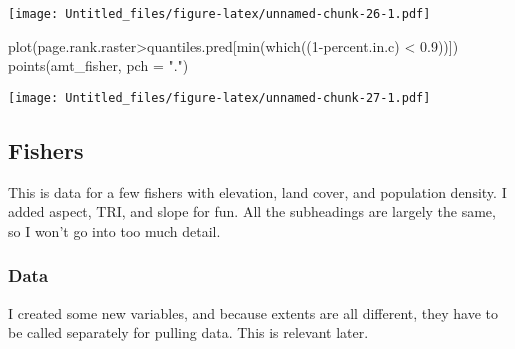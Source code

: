 \documentclass[
]{article}
\newenvironment{Shaded}{\begin{snugshade}}{\end{snugshade}}
\newcommand{\AttributeTok}[1]{\textcolor[rgb]{0.77,0.63,0.00}{#1}}
\newcommand{\DecValTok}[1]{\textcolor[rgb]{0.00,0.00,0.81}{#1}}
\newcommand{\FloatTok}[1]{\textcolor[rgb]{0.00,0.00,0.81}{#1}}
\newcommand{\FunctionTok}[1]{\textcolor[rgb]{0.00,0.00,0.00}{#1}}
\newcommand{\NormalTok}[1]{#1}
\newcommand{\SpecialCharTok}[1]{\textcolor[rgb]{0.00,0.00,0.00}{#1}}
\newcommand{\StringTok}[1]{\textcolor[rgb]{0.31,0.60,0.02}{#1}}
\begin{document}
\texttt{[image: Untitled\_files/figure-latex/unnamed-chunk-26-1.pdf]}

\begin{Shaded}
\begin{Highlighting}[]
\FunctionTok{plot}\NormalTok{(page.rank.raster}\SpecialCharTok{\textgreater{}}\NormalTok{quantiles.pred[}\FunctionTok{min}\NormalTok{(}\FunctionTok{which}\NormalTok{((}\DecValTok{1}\SpecialCharTok{{-}}\NormalTok{percent.in.c) }\SpecialCharTok{\textless{}} \FloatTok{0.9}\NormalTok{))])}
\FunctionTok{points}\NormalTok{(amt\_fisher, }\AttributeTok{pch =} \StringTok{"."}\NormalTok{)}
\end{Highlighting}
\end{Shaded}

\texttt{[image: Untitled\_files/figure-latex/unnamed-chunk-27-1.pdf]}

\hypertarget{fishers}{%
\subsection{Fishers}\label{fishers}}

This is data for a few fishers with elevation, land cover, and
population density. I added aspect, TRI, and slope for fun. All the
subheadings are largely the same, so I won't go into too much detail.

\hypertarget{data-1}{%
\subsubsection{Data}\label{data-1}}

I created some new variables, and because extents are all different,
they have to be called separately for pulling data. This is relevant
later.
\end{document}
